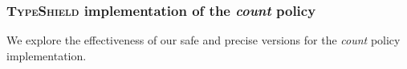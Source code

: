 \begin{table}[h!]
		\caption {The results of comparing theoretical limits for the different restriction policies throughout different optimizations.}
		\label{tbl:policycomp}
\end{table}

\newpage
\subsubsection{\textsc{TypeShield} implementation of the \textit{count} policy}
\label{subsection:typeshieldvslimitcount}
We explore the effectiveness of our safe and precise versions for the \textit{count} policy implementation.

